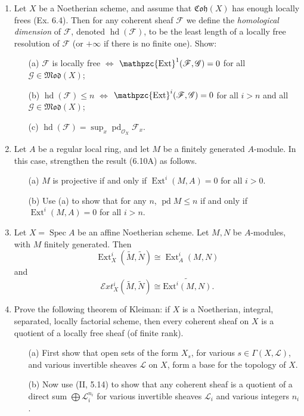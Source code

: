 \documentclass{article}
\newcommand{\goth}[1]{\mathfrak{#1}}
\newcommand{\fF}{\mathscr{F}}
\newcommand{\fG}{\mathscr{G}}
\newcommand{\fO}{\mathscr{O}}
\newcommand{\fL}{\mathscr{L}}
\DeclareMathOperator{\hd}{hd}
\DeclareMathOperator{\pd}{pd}
\DeclareMathOperator{\Ext}{Ext}
\DeclareMathOperator{\rExt}{\mathpzc{Ext}}
\DeclareMathOperator{\spec}{Spec}
\begin{document}
\begin{enumerate} [label=\textbf{\arabic*.}, leftmargin=0em]
\item Let $X$ be a Noetherian scheme, and assume that $\goth{Coh}(X)$ has enough locally frees (Ex. 6.4). Then for any coherent sheaf $\fF$ we define the \textit{homological dimension} of $\fF$, denoted $\hd(\fF)$, to be the least length of a locally free resolution of $\fF$ (or $+\infty$ if there is no finite one). Show:
\begin{itemize}
  \item[(a)] $\fF$ is locally free $\iff$ $\rExt^1(\fF, \fG) = 0$ for all $\fG \in \goth{Mod}(X)$;
  \item[(b)] $\hd(\fF) \leq n$ $ \iff$ $\rExt^i(\fF, \fG) = 0$ for all $i > n$ and all $\fG \in \goth{Mod}(X)$;
  \item[(c)] $\hd(\fF) = \sup_x{\pd_{\fO_X} \fF_x}$.
\end{itemize}

\item Let $A$ be a regular local ring, and let $M$ be a finitely generated $A$-module. In this case, strengthen the result (6.10A) as follows.
\begin{itemize}
  \item[(a)] $M$ is projective if and only if $\Ext^i(M, A) = 0$ for all $i > 0$.
  \item[(b)] Use (a) to show that for any $n$, $\pd M \leq n$ if and only if $\Ext^i(M, A) = 0$ for all $i > n$.
\end{itemize}

\item Let $X = \spec{A}$ be an affine Noetherian scheme. Let $M, N$ be $A$-modules, with $M$ finitely generated. Then
\begin{equation*}
  \Ext_X^i(\tilde{M}, \tilde{N}) \cong \Ext_A^i(M, N)
\end{equation*}
and
\begin{equation*}
  \mathscr{E}xt_X^i(\tilde{M}, \tilde{N}) \cong \widetilde{\text{Ext}^i(M, N)}.
\end{equation*}

\item Prove the following theorem of Kleiman: if $X$ is a Noetherian, integral, separated, locally factorial scheme, then every coherent sheaf on $X$ is a quotient of a locally free sheaf (of finite rank).
\begin{itemize}
  \item[(a)] First show that open sets of the form $X_s$, for various $s \in \Gamma(X, \fL)$, and various invertible sheaves $\fL$ on $X$, form a base for the topology of $X$.
  \item[(b)] Now use (II, 5.14) to show that any coherent sheaf is a quotient of a direct sum $\bigoplus \fL_i^{n_i}$ for various invertible sheaves $\fL_i$ and various integers $n_i$.
\end{itemize}


\end{enumerate}
\end{document}
